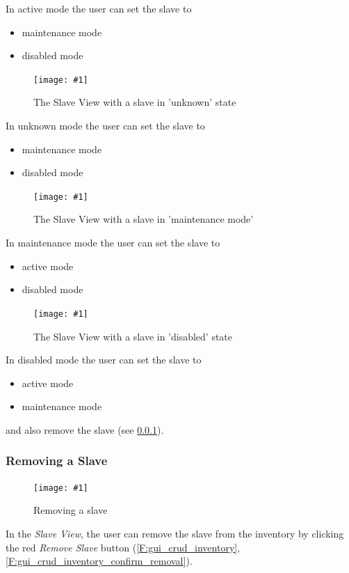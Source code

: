 \documentclass[a4paper, 11pt]{article}
\newcommand{\mamidscreenshot}[1]{\texttt{[image: \#1]}}
\begin{document}
In \gls{active mode} the user can set the slave to
\begin{itemize}
	\item \gls{maintenance mode}
	\item \gls{disabled mode}
\end{itemize}
\begin{figure}[H]
	\centering
	\mamidscreenshot{screenshots/slave_edit_unknown.png}
	\caption{The Slave View with a slave in 'unknown' state}
\end{figure}
In unknown mode the user can set the slave to
\begin{itemize}
	\item \gls{maintenance mode}
	\item \gls{disabled mode}
\end{itemize}
\begin{figure}[H]
	\centering
	\mamidscreenshot{screenshots/slave_edit_maintenance}
	\caption{The Slave View with a slave in 'maintenance mode'}
\end{figure}
In \gls{maintenance mode} the user can set the slave to
\begin{itemize}
	\item \gls{active mode}
	\item \gls{disabled mode}
\end{itemize}
\begin{figure}[H]
	\centering
	\mamidscreenshot{screenshots/slave_edit_disabled.png}
	\caption{The Slave View with a slave in 'disabled' state}
\end{figure}
In \gls{disabled mode} the user can set the slave to
\begin{itemize}
	\item \gls{active mode}
	\item \gls{maintenance mode}
\end{itemize}
and also remove the slave (see \ref{subsec:ui:remove_slave}).
\subsubsection{Removing a Slave}\label{subsec:ui:remove_slave}
\begin{figure}[H]
	\centering
	\mamidscreenshot{screenshots/slave_remove}
	\caption{Removing a slave}
\end{figure}
In the \textit{Slave View}, the user can remove the slave from the inventory by clicking the red \textit{Remove Slave} button (\ref{F:gui_crud_inventory}, \ref{F:gui_crud_inventory_confirm_removal}).
\end{document}
